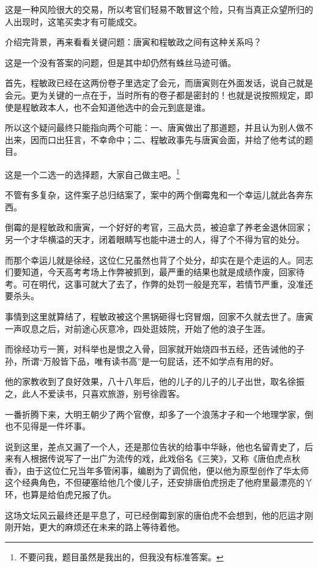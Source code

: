 \begin{multicols}{\theparacolNo}
这是一种风险很大的交易，所以考官们轻易不敢冒这个险，只有当真正众望所归的人出现时，这笔买卖才有可能成交。

介绍完背景，再来看看关键问题：唐寅和程敏政之间有这种关系吗？

这是一个没有答案的问题，但是其中却仍然有蛛丝马迹可循。

首先，程敏政已经在这两份卷子里选定了会元，而唐寅则在外面发话，说自己就是会元。更为关键的一点在于，当时所有的卷子都是密封的！也就是说按照规定，即使是程敏政本人，也不会知道他选中的会元到底是谁。

所以这个疑问最终只能指向两个可能：一、唐寅做出了那道题，并且认为别人做不出来，因而口出狂言，不幸命中；二、程敏政事先与唐寅会面，并给了他考试的题目。

这是一个二选一的选择题，大家自己做主吧。\footnote{不要问我，题目虽然是我出的，但我没有标准答案。}

不管有多复杂，这件案子总归结案了，案中的两个倒霉鬼和一个幸运儿就此各奔东西。

倒霉的是程敏政和唐寅，一个好好的考官，三品大员，被迫拿了养老金退休回家；另一个才华横溢的天才，闭着眼睛写也能中进士的人，得了个不得为官的处分。

而那个幸运儿就是徐经，这位仁兄虽然也背了个处分，却实在是个走运的人。同志们要知道，今天高考考场上作弊被抓到，最严重的结果也就是成绩作废，回家待考。可在明代，这事可就大了去了，作弊的处罚一般是充军，若情节严重，没准还要杀头。

事情到这里就算结了，程敏政被这个黑锅砸得七窍冒烟，回家不久就去世了。唐寅一声叹息之后，对前途心灰意冷，四处逛妓院，开始了他的浪子生涯。

而徐经功亏一篑，对科举也是恨之入骨，回家就开始烧四书五经，还告诫他的子孙，所谓“万般皆下品，唯有读书高”是一句屁话，还不如学点有用的好。

他的家教收到了良好效果，八十八年后，他的儿子的儿子的儿子出世，取名徐振之，此人不爱读书，只喜欢旅游，别号徐霞客。

一番折腾下来，大明王朝少了两个官僚，却多了一个浪荡才子和一个地理学家，倒也不见得是一件坏事。

说到这里，差点又漏了一个人，还是那位告状的给事中华眿，他也名留青史了，后来有人根据传说写了一出广为流传的戏，此戏俗名《三笑》，又称《唐伯虎点秋香》，由于这位仁兄当年多管闲事，编剧为了调侃他，便以他为原型创作了华太师这个经典角色，不但硬塞给他几个傻儿子，还安排唐伯虎拐走了他府里最漂亮的丫环，也算是给伯虎兄报了仇。

这场文坛风云最终还是平息了，可已经倒霉到家的唐伯虎不会想到，他的厄运才刚刚开始，更大的麻烦还在未来的路上等待着他。


\end{multicols}
